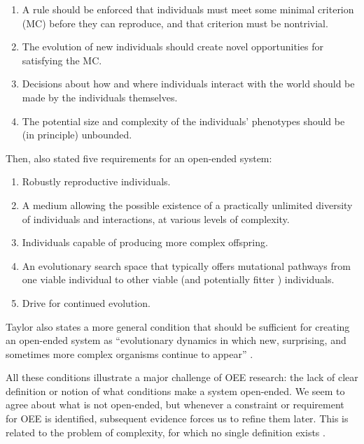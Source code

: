 \begin{enumerate}
  \item A rule should be enforced that individuals must meet some minimal
        criterion (MC) before they can reproduce, and that criterion must be
        nontrivial.
  \item The evolution of new individuals should create novel opportunities for
        satisfying the MC.
  \item Decisions about how and where individuals interact with the world should
        be made by the individuals themselves.
  \item The potential size and complexity of the individuals' phenotypes should
        be (in principle) unbounded.
\end{enumerate}
Then, \textcite{taylorRequirementsOpenEndedEvolution2015} also stated five
requirements for an open-ended system:

\begin{enumerate}
  \item Robustly reproductive individuals.
  \item A medium allowing the possible existence of a practically unlimited
        diversity of individuals and interactions, at various levels of
        complexity.
  \item Individuals capable of producing more complex offspring.
  \item An evolutionary search space that typically offers mutational pathways
        from one viable individual to other viable (and potentially fitter )
        individuals.
  \item Drive for continued evolution.
\end{enumerate}
Taylor also states a more general condition that should be sufficient for
creating an open-ended system as ``evolutionary dynamics in which new,
surprising, and sometimes more complex organisms continue to appear''
\parencite{taylorRequirementsOpenEndedEvolution2015,
  taylorOpenEndedEvolutionPerspectives2016}.

All these conditions illustrate a major challenge of \ac{OEE} research: the lack
of clear definition or notion of what conditions make a system open-ended. We
seem to agree about what is not open-ended, but whenever a constraint or
requirement for \ac{OEE} is identified, subsequent evidence forces us to refine
them later. This is related to the problem of complexity, for which no single
definition exists \parencite{johnsonSimplyComplexityClear2009}.

